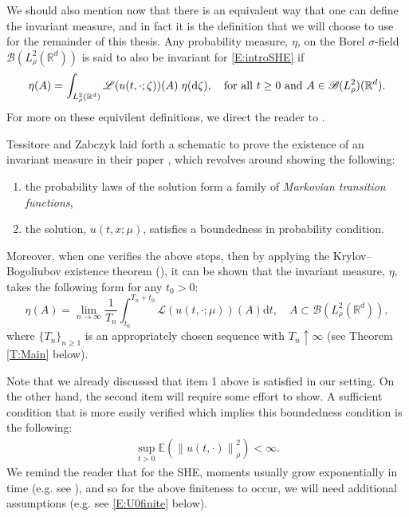 \documentclass[12pt]{report}
\theoremstyle{plain}
\theoremstyle{definition}
\numberwithin{equation}{section}
\newcommand{\R}{\mathbb{R}}
\newcommand{\E}{\mathbb{E}}
\newcommand{\Norm}[1]{\left\|  #1   \right\|}
\newcommand{\ud}{\ensuremath{ \mathrm{d} }}
\begin{document}
We should also mention now that there is an equivalent way that one can define the invariant measure, and in fact it is the definition that we will choose to use for the remainder of this thesis. Any probability measure, $\eta$, on the Borel $\sigma$-field $\mathscr{B}(L^2_{\rho}(\R^d))$ is said to also be invariant for \eqref{E:introSHE} if
\begin{equation}\label{E:IntroInvMeas}
\eta(A) = \int_{L^2_{\rho}(\R^d)} \mathscr{L}(u(t,\cdot;\zeta))(A) \; \eta(\ud \zeta),
\quad \text{for all $ t\ge 0$ and $A\in \mathscr{B}(L^2_{\rho})(\R^d)$}.
\end{equation} 
For more on these equivilent definitions, we direct the reader to \cite[Section 11.1]{da-prato.zabczyk:14:stochastic}.

Tessitore and Zabczyk laid forth a schematic to prove the existence of an invariant measure in their paper \cite{tessitore.zabczyk:98:invariant}, which revolves around showing the following:
\begin{enumerate}
	\item the probability laws of the solution form a family of {\em Markovian transition functions},
	\item  the solution, $u(t,x;\mu)$, satisfies a boundedness in probability condition.
\end{enumerate}
Moreover, when one verifies the above steps, then by applying the Krylov–Bogoliubov existence theorem (\cite[Theorem 11.7]{da-prato.zabczyk:14:stochastic}), it can be shown that the invariant measure, $\eta$, takes the following form for any $t_0 > 0$:
	\begin{equation} \label{E:IntroInvMeasForm}
	\eta(A) = \lim_{n \to \infty} \frac{1}{T_n} \int_{t_0}^{T_n + t_0} \mathscr{L}(u(t,\cdot; \mu))(A) \ud t, \quad A \subset \mathscr{B}(L^2_{\rho}(\R^d)),
	\end{equation}
where $\{T_n\}_{n\ge 1}$ is an appropriately chosen sequence with $T_n\uparrow \infty$ (see Theorem \ref{T:Main} below).

Note that we already discussed that item 1 above is satisfied in our setting. On the other hand, the second item will require some effort to show. A sufficient condition that is more easily verified which implies this boundedness condition is the following:
	\begin{align} \label{E:IntroBddMnt}
	\sup_{t>0} \E\left(\Norm{u(t,\cdot)}_{\rho}^2\right)
	<\infty.
	\end{align}
We remind the reader that for the SHE, moments usually grow exponentially in time (e.g. see \cite[Theorem 1.3]{chen.kim:19:nonlinear}), and so for the above finiteness to occur, we will need additional assumptions (e.g. see \eqref{E:U0finite} below). 
\end{document}
